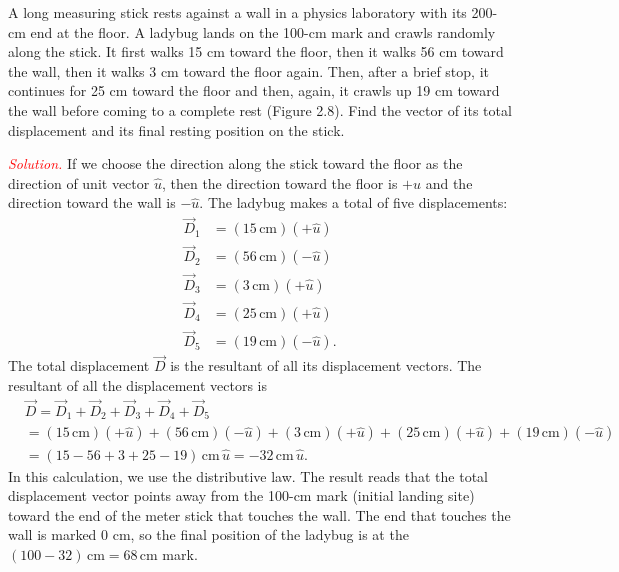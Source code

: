 \documentclass{report}
\begin{document}
    \bigbreak \noindent 
    \begin{exm}
        A long measuring stick rests against a wall in a physics laboratory with its 200-cm end at the floor. A ladybug lands on the 100-cm mark and crawls randomly along the stick. It first walks 15 cm toward the floor, then it walks 56 cm toward the wall, then it walks 3 cm toward the floor again. Then, after a brief stop, it continues for 25 cm toward the floor and then, again, it crawls up 19 cm toward the wall before coming to a complete rest (Figure 2.8). Find the vector of its total displacement and its final resting position on the stick.
    \end{exm}
    \bigbreak \noindent 
    \textcolor{red}{\textit{Solution.}}
    If we choose the direction along the stick toward the floor as the direction of unit vector $\hat{u}$, then the direction toward the floor is $+\hat{u}$ and the direction toward the wall is $-\hat{u}$. The ladybug makes a total of five displacements:
    \begin{align*}
        \vec{D}_1 &= (15\,\text{cm})(+\hat{u}) \\
        \vec{D}_2 &= (56\,\text{cm})(-\hat{u}) \\
        \vec{D}_3 &= (3\,\text{cm})(+\hat{u})  \\
        \vec{D}_4 &= (25\,\text{cm})(+\hat{u})  \\
        \vec{D}_5 &= (19\,\text{cm})(-\hat{u})
    .\end{align*}
    The total displacement $\vec{D}$ is the resultant of all its displacement vectors.
    \bigbreak \noindent 
    The resultant of all the displacement vectors is
    \begin{align*}
        &\vec{D} = \vec{D}_1 + \vec{D}_2 + \vec{D}_3 + \vec{D}_4 + \vec{D}_5  \\
        &= (15\,\text{cm})(+\hat{u}) + (56\,\text{cm})(-\hat{u}) + (3\,\text{cm})(+\hat{u}) + (25\,\text{cm})(+\hat{u}) + (19\,\text{cm})(-\hat{u})  \\
        &= (15 - 56 + 3 + 25 - 19)\,\text{cm}\,\hat{u} = -32\,\text{cm}\,\hat{u}
    .\end{align*}
    In this calculation, we use the distributive law. The result reads that the total displacement vector points away from the 100-cm mark (initial landing site) toward the end of the meter stick that touches the wall. The end that touches the wall is marked 0 cm, so the final position of the ladybug is at the $(100 - 32)\,\text{cm} = 68\,\text{cm}$ mark.
\end{document}
